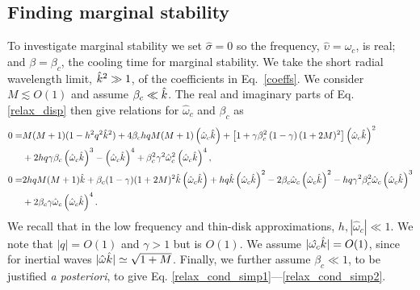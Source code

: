 \subsection{Finding marginal stability}\label{disp_neut_limit}
To investigate marginal stability we set $\hat{\sigma} = 0$ so the
frequency, $\hat{\upsilon}=\hat{\omega}_c$, is real; and $\beta =
\beta_c$,  the cooling time for marginal stability. 
We take the short radial wavelength limit, $\hat{k}^2\gg 1$, of the
coefficients in Eq.\ \ref{coeffs}. We consider $M \lesssim O(1)$ and
assume $\beta_c \ll \hat{k}$.  The real and 
imaginary parts of Eq. \ref{relax_disp} then give relations for $\hat{\omega}_c$ and $\beta_c$ as 
\begin{align}
  0 =&M(M+1)(1-h^2 q^2 \hat{k}^2) + 4\beta_c h q M(M+1)\left(\hat{\omega}_c\hat{k}\right) 
 +\left[1 +
    \gamma\beta_c^2\left(1-\gamma\right)(1+2M)^2\right]\left(\hat{\omega}_c\hat{k}\right)^2 \label{relax_cond1} \\
 &+ 2h q \gamma\beta_c \left(\hat{\omega}_c\hat{k}\right)^3 -  \left(\hat{\omega}_c\hat{k}\right)^4 
  + \beta_c^2\gamma^2\hat{\omega}_c^2
  \left(\hat{\omega}_c\hat{k}\right)^4, \notag \\
   0=& 2h q M (M+1)\hat{k} +
   \beta_c(1-\gamma)(1+2M)^2\hat{k}\left(\hat{\omega}_c\hat{k}\right) 
   + h q \hat{k} \left(\hat{\omega}_c\hat{k}\right)^2 -
   2\beta_c\hat{\omega}_c\left(\hat{\omega}_c\hat{k}\right)^2
   - h q
   \gamma^2\beta_c^2\hat{\omega}_c\left(\hat{\omega}_c\hat{k}\right)^3 \label{relax_cond2} \\
   &+
   2\beta_c\gamma\hat{\omega}_c\left(\hat{\omega}_c\hat{k}\right)^4 \notag. 
\end{align}
We recall that in the low frequency and thin-disk approximations, $h,
|\hat{\omega}_c| \ll 1$. We note that $|q|=O(1)$ and 
$\gamma>1$ but is $O(1)$. We assume $|\hat{\omega_c}\hat{k}|=O(1)$,
since for inertial waves $|\hat{\omega}\hat{k}|\simeq \sqrt{1 + M}$. Finally, we further assume 
$\beta_c \ll 1$, to be justified \emph{a posteriori}, to give 
Eq. \ref{relax_cond_simp1}---\ref{relax_cond_simp2}.   

